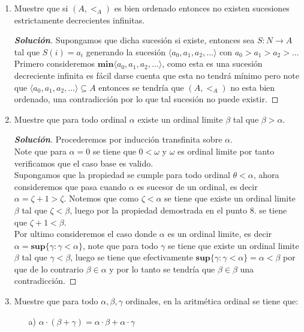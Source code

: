 \documentclass[11pt]{article}
\numberwithin{equation}{section}
\numberwithin{figure}{section}
\begin{document}
\begin{enumerate}
\begin{proof}[\textbf{Solución}]
    \end{proof}
    \item Muestre que si $(A,<_A)$ es bien ordenado entonces no existen sucesiones estrictamente decrecientes infinitas.
    \begin{proof}[\textbf{Solución}]
    Supongamos que dicha sucesión si existe, entonces sea $S:N\longrightarrow A$ tal que $S(i)=a_i$ generando la sucesión $\langle a_0,a_1,a_2,\dotsc\rangle$ con $a_0>a_1>a_2>\dotsc$\\
    Primero consideremos $\textbf{min}\langle a_0,a_1,a_2,\dotsc\rangle$, como esta es una sucesión decreciente infinita es fácil darse cuenta que esta no tendrá mínimo pero note que  $\langle a_0,a_1,a_2,\dotsc\rangle\subseteq A$ entonces se tendría que $(A,<_A)$ no esta bien ordenado, una contradicción por lo que tal sucesión no puede existir.
    \end{proof}
    \item Muestre que para todo ordinal $\alpha$ existe un ordinal limite $\beta$ tal que $\beta>\alpha$.
    \begin{proof}[\textbf{Solución}]
    Procederemos por inducción transfinita sobre $\alpha$.\\
    Note que para $\alpha=0$ se tiene que $0<\omega$ y $\omega$ es ordinal limite por tanto verificamos que el caso base es valido.\\
   Supongamos que la propiedad se cumple para todo ordinal $\theta<\alpha$, ahora consideremos que pasa cuando $\alpha$ es sucesor de un ordinal, es decir $\alpha=\zeta+1>\zeta$. Notemos que como $\zeta<\alpha$ se tiene que existe un ordinal limite $\beta$ tal que $\zeta<\beta$, luego por la propiedad demostrada en el punto $8.$ se tiene que $\zeta+1<\beta$.\\
   Por ultimo consideremos el caso donde $\alpha$ es un ordinal limite, es decir $\alpha=\textbf{sup}\{\gamma:\gamma<\alpha\}$, note que para todo $\gamma$ se tiene que existe un ordinal limite $\beta$ tal que $\gamma<\beta$, luego se tiene que efectivamente $\textbf{sup}\{\gamma:\gamma<\alpha\}=\alpha<\beta$ por que de lo contrario $\beta\in\alpha$ y por lo tanto se tendría que $\beta\in\beta$ una contradicción.
    \end{proof}
    \item Muestre que para todo $\alpha,\beta,\gamma$ ordinales, en la aritmética ordinal se tiene que:
    \begin{itemize}
        \item[a)] $\alpha\cdot(\beta+\gamma)=\alpha\cdot\beta+\alpha\cdot\gamma$

\end{itemize}
\end{enumerate}
\end{document}
